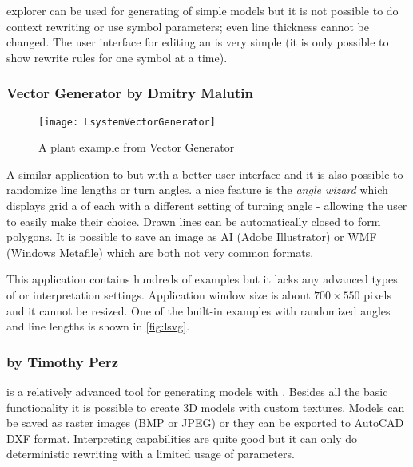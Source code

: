 \lsystems explorer can be used for generating of simple models but it is not possible to do context rewriting or use symbol parameters; even line thickness cannot be changed.
The user interface for editing an \lsystem is very simple (it is only possible to show rewrite rules for one symbol at a time).


\subsubsection{\lsystem Vector Generator by Dmitry Malutin}

\begin{wrapfigure}{r}{0.4\textwidth}
	\vspace{-20pt}
	\texttt{[image: LsystemVectorGenerator]}
	\caption{A plant example from \lsystem Vector Generator}
	\label{fig:lsvg}
\end{wrapfigure}

\noindent
A similar application to  but with a better user interface and it is also possible to randomize line lengths or turn angles.
a nice feature is the \emph{angle wizard} which displays grid a of \lsystems each with a different setting of turning angle - allowing the user to easily make their choice.
Drawn lines can be automatically closed to form polygons.
It is possible to save an image as AI (Adobe Illustrator) or WMF (Windows Metafile) which are both not very common formats.

This application contains hundreds of examples but it lacks any advanced types of \lsystems or interpretation settings.
Application window size is about $700 \times 550$ pixels and it cannot be resized.
One of the built-in examples with randomized angles and line lengths is shown in \autoref{fig:lsvg}.


\subsubsection{ by Timothy Perz}

\noindent
{} is a relatively advanced tool for generating models with \lsystems.
Besides all the basic functionality it is possible to create 3D models with custom textures.
Models can be saved as raster images (BMP or JPEG) or they can be exported to AutoCAD DXF format.
Interpreting capabilities are quite good but it can only do deterministic rewriting with a limited usage of parameters.

